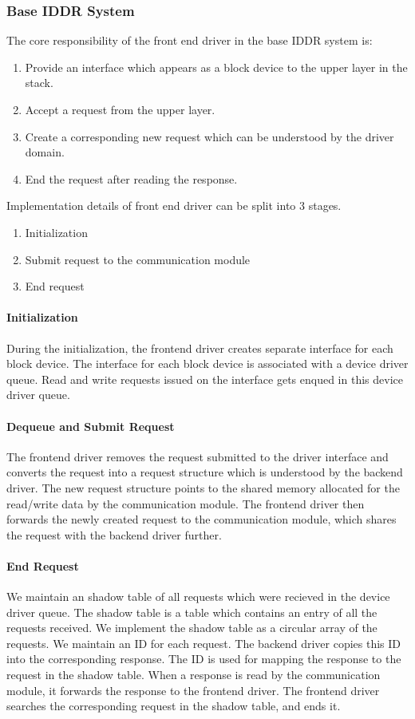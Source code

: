 \subsubsection*{Base IDDR System}
The core responsibility of the front end driver in the base IDDR system is:
\begin{enumerate}
\item Provide an interface which appears as a block device to the upper layer in the stack.
\item Accept a request from the upper layer.
\item Create a corresponding new request which can be understood by the driver domain.
\item End the request after reading the response.
\end{enumerate}

Implementation details of front end driver can be split into 3 stages. 
\begin{enumerate}
\item Initialization
\item Submit request to the communication module
\item End request
\end{enumerate}

\paragraph{Initialization}
During the initialization, the frontend driver creates separate interface for each block device. The interface for each block device is associated with a device driver queue. Read and write requests issued on the interface gets enqued in this device driver queue.

\paragraph{Dequeue and Submit Request}
The frontend driver removes the request submitted to the driver interface and converts the request into a request structure which is understood by the backend driver. The new request structure points to the shared memory allocated for the read/write data by the communication module. The frontend driver then forwards the newly created request to the communication module, which shares the request with the backend driver further.

\paragraph{End Request}
We maintain an shadow table of all requests which were recieved in the device driver queue. The shadow table is a table which contains an entry of all the requests received. We implement the shadow table as a circular array of the requests. We maintain an ID for each request. The backend driver copies this ID into the corresponding response. The ID is used for mapping the response to the request in the shadow table. When a response is read by the communication module, it forwards the response to the frontend driver. The frontend driver searches the corresponding request in the shadow table, and ends it. 

